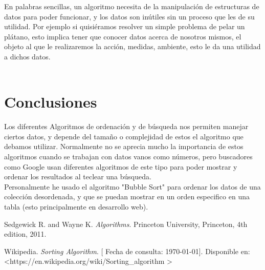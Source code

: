 \documentclass[spanish,12pt,letterpapper]{article}
\begin{document}
	En palabras sencillas, un algoritmo necesita de la manipulaci\'on de estructuras de datos para poder funcionar, y los datos son in\'utiles sin un proceso que les de su utilidad. Por ejemplo si quisi\'eramos resolver un simple problema de pelar un pl\'atano, esto implica tener que conocer datos acerca de nosotros mismos, el objeto al que le realizaremos la acci\'on, medidas, ambiente, esto le da una utilidad a dichos datos.\\\\
	
	
	\section{Conclusiones \\}
	Los diferentes Algoritmos de ordenación y de búsqueda nos permiten manejar ciertos datos, y depende del tamaño o complejidad de estos el algoritmo que debamos utilizar. Normalmente no se aprecia mucho la importancia de estos algoritmos cuando se trabajan con datos vanos como números, pero buscadores como Google usan diferentes algoritmos de este tipo para poder mostrar y ordenar los resultados al teclear una búsqueda. \\
	
	Personalmente he usado el algoritmo "Bubble Sort" para ordenar los datos de una colección desordenada, y que se puedan mostrar en un orden especifico en una tabla (esto principalmente en desarrollo web).
	
	\pagebreak
	
	\begin{thebibliography}{9}
		 Sedgewick R. and Wayne K. 
		\emph{Algorithms}. Princeton University, Princeton, 4th edition, 2011.
		
		 Wikipedia. 
		\emph{Sorting Algorithm}.  {[} Fecha de consulta: \today {]}. Disponible en: \textless https://en.wikipedia.org/wiki/Sorting\_algorithm \textgreater
	\end{thebibliography}
	
\end{document}
